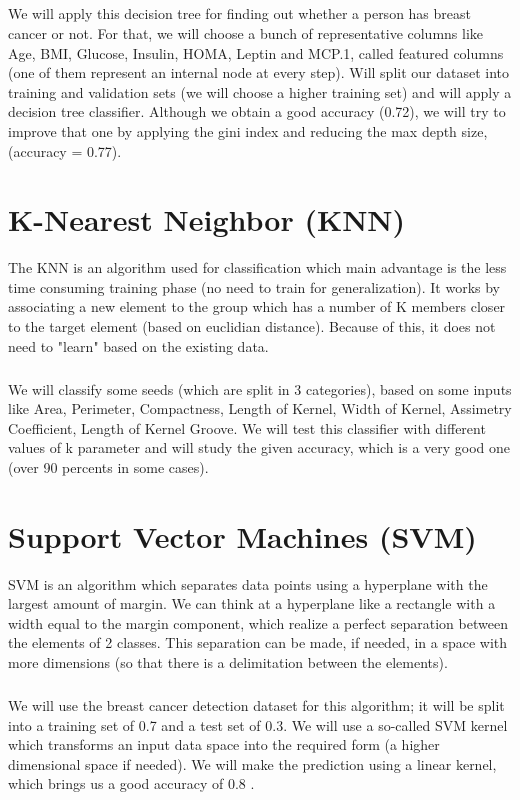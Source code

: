 \documentclass[a4paper,12pt]{report}
\begin{document}
\paragraph{}
We will apply this decision tree for finding out whether a person has breast cancer or not. For that, we will choose a bunch of representative columns like Age, BMI, Glucose, Insulin, HOMA, Leptin and MCP.1, called featured columns (one of them represent an internal node at every step). Will split our dataset into training and validation sets (we will choose a higher training set) and will apply a decision tree classifier. Although we obtain a good accuracy (0.72), we will try to improve that one by applying the gini index and reducing the max depth size, (accuracy = 0.77).

{\let\clearpage\relax \chapter{K-Nearest Neighbor (KNN)}}
The KNN is an algorithm used for classification which main advantage is the less time consuming training phase (no need to train for generalization). It works by associating a new element to the group which has a number of K members closer to the target element (based on euclidian distance). Because of this, it does not need to "learn" based on the existing data.
\paragraph{}
We will classify some seeds (which are split in 3 categories), based on some inputs like Area, Perimeter, Compactness, Length of Kernel, Width of Kernel, Assimetry Coefficient, Length of Kernel Groove. We will test this classifier with different values of k parameter and will study the given accuracy, which is a very good one (over 90 percents in some cases).

{\let\clearpage\relax \chapter{Support Vector Machines (SVM)}}
SVM is an algorithm which separates data points using a hyperplane with the largest amount of margin. We can think at a hyperplane like a rectangle with a width equal to the margin component, which realize a perfect separation between the elements of 2 classes. This separation can be made, if needed, in a space with more dimensions (so that there is a delimitation between the elements).
\paragraph{}
We will use the breast cancer detection dataset for this algorithm; it will be split into a training set of 0.7 and a test set of 0.3. We will use a so-called SVM kernel which transforms an input data space into the required form (a higher dimensional space if needed). We will make the prediction using a linear kernel, which brings us a good accuracy of 0.8 .
\end{document}
